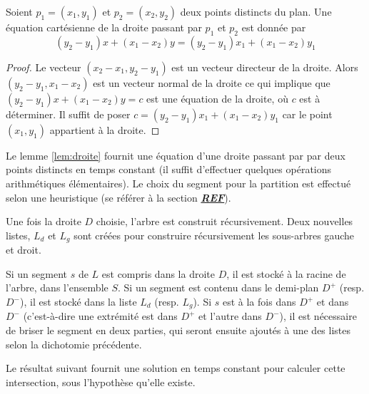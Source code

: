 \begin{lem}\label{lem:droite}
  Soient $p_1 = (x_1, y_1)$ et $p_2 = (x_2, y_2)$ deux points distincts du
  plan. Une équation cartésienne de la droite  passant par $p_1$ et $p_2$
  est donnée par
  \begin{equation}
    \left(y_2 - y_1\right) x + \left(x_1 - x_2\right) y =
    \left(y_2 - y_1\right) x_1 + \left(x_1 - x_2\right) y_1
  \end{equation}
\end{lem}
\begin{proof}
  Le vecteur $(x_2 - x_1, y_2 - y_1)$ est un vecteur directeur de la droite.
  Alors $(y_2 - y_1, x_1 - x_2)$ est un vecteur normal de la droite ce qui
  implique que
  $\left(y_2 - y_1\right) x + \left(x_1 - x_2\right) y = c$ est une équation
  de la droite, où $c$ est à déterminer. Il suffit de poser
  $c = \left(y_2 - y_1\right) x_1 + \left(x_1 - x_2\right) y_1$
  car le point $(x_1, y_1)$ appartient à la droite.
\end{proof}

Le lemme \ref{lem:droite} fournit une équation d'une droite passant par
par deux points distincts en temps constant (il suffit d'effectuer
quelques opérations arithmétiques élémentaires). Le choix du segment
pour la partition est effectué selon une heuristique (se référer à la section
{\Huge \underline{\textsl{\textbf{REF}}}}).

Une fois la droite $D$ choisie, l'arbre est construit récursivement.
Deux nouvelles listes, $L_d$ et $L_g$ sont créées pour construire récursivement
les sous-arbres gauche et droit.

Si un segment $s$ de $L$ est compris dans la droite $D$, il est stocké à
la racine de l'arbre, dans l'ensemble $S$. Si un segment est contenu dans
le demi-plan $D^+$ (resp. $D^-$), il est stocké dans la liste $L_d$ (resp.
$L_g$). Si $s$ est à la fois dans $D^+$ et dans $D^-$ (c'est-à-dire une
extrémité est dans $D^+$ et l'autre dans $D^-$), il est nécessaire
de briser le segment en deux parties, qui seront ensuite ajoutés à une des
listes selon la dichotomie précédente.

Le résultat suivant fournit une solution en temps constant pour calculer
cette intersection, sous l'hypothèse qu'elle existe.

